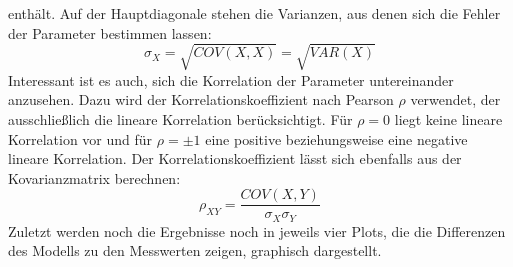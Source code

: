 enthält. Auf der Hauptdiagonale stehen die Varianzen, aus denen sich die Fehler der Parameter bestimmen lassen:
\begin{equation}
\sigma_X=\sqrt{COV(X,X)}=\sqrt{VAR(X)}
\end{equation}
Interessant ist es auch, sich die Korrelation der Parameter untereinander anzusehen. Dazu wird der Korrelationskoeffizient nach Pearson $\rho$ verwendet, der ausschließlich die lineare Korrelation berücksichtigt. Für $\rho=0$ liegt keine lineare Korrelation vor und für $\rho=\pm1$ eine positive beziehungsweise eine negative lineare Korrelation. Der Korrelationskoeffizient lässt sich ebenfalls aus der Kovarianzmatrix berechnen:
\begin{equation}
\rho_{XY}=\frac{COV(X,Y)}{\sigma_X\sigma_Y}
\end{equation}
Zuletzt werden noch die Ergebnisse noch in jeweils vier Plots, die die Differenzen des Modells zu den Messwerten zeigen, graphisch dargestellt.


